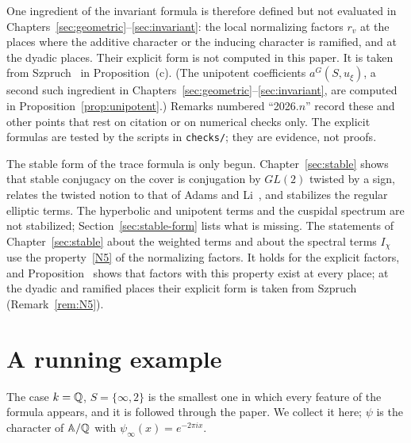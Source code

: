 One ingredient of the invariant formula is therefore defined but not
evaluated in Chapters~\ref{sec:geometric}--\ref{sec:invariant}: the local
normalizing factors $r_v$ at the places where the additive character or
the inducing character is ramified, and at the dyadic places. Their
explicit form is not computed in this paper. It is taken from
Szpruch~\cite{Sz09,Sz16} in Proposition~\normref{}(c). (The unipotent coefficients $a^G(S,u_\xi)$, a second such
ingredient in Chapters~\ref{sec:geometric}--\ref{sec:invariant}, are
computed in Proposition~\ref{prop:unipotent}.) Remarks
numbered ``2026.$n$'' record these and other points that rest on
citation or on numerical checks only. The explicit formulas are tested
by the scripts in \texttt{checks/}; they are evidence, not proofs.

The stable form of the trace formula is only begun.
Chapter~\ref{sec:stable} shows that stable conjugacy on the cover is
conjugation by $GL(2)$ twisted by a sign, relates the twisted notion to
that of Adams and Li~\cite{Ad98,Li11}, and stabilizes the regular
elliptic terms. The
hyperbolic and unipotent terms and the cuspidal spectrum are not
stabilized; Section~\ref{sec:stable-form} lists what is missing. The
statements of Chapter~\ref{sec:stable} about the weighted terms and about
the spectral terms $I_\chi$ use the property~\ref{N5} of the normalizing
factors. It holds for the explicit factors, and
Proposition~\normref{} shows that factors with this property exist at
every place; at the dyadic and ramified places their explicit form is
taken from Szpruch~\cite{Sz09,Sz16} (Remark~\ref{rem:N5}).

\section{A running example}\label{sec:running}

The case $k=\mathbb{Q}$, $S=\{\infty,2\}$ is the smallest one in which every
feature of the formula appears, and it is followed through the paper. We
collect it here; $\psi$ is the character of $\mathbb{A}/\mathbb{Q}$ with
$\psi_\infty(x)=e^{-2\pi ix}$.

